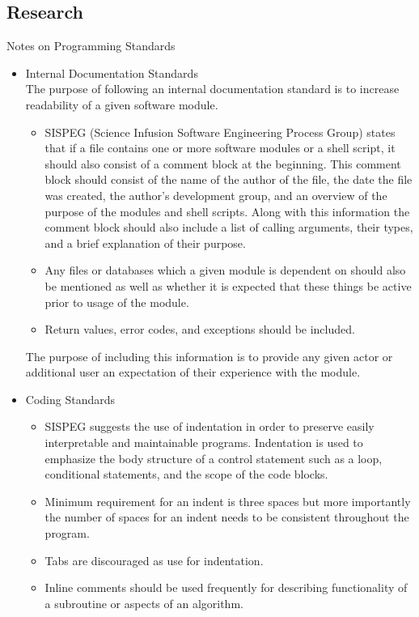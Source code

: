 \documentclass[12pt]{article}
\begin{document}
\subsection*{Research}
Notes on Programming Standards
\begin{itemize}
\item Internal Documentation Standards\\
	The purpose of following an internal documentation standard is to increase readability of a given software module. 
	\begin{itemize}
	\item SISPEG (Science Infusion Software Engineering Process Group) states that if a file contains one or more software modules or a shell script, it should also consist of a comment block at the beginning. This comment block should consist of the name of the author of the file, the date the file was created, the author's development group, and an overview of the purpose of the modules and shell scripts. Along with this information the comment block should also include a list of calling arguments, their types, and a brief explanation of their purpose. 
	\item Any files or databases which a given module is dependent on should also be mentioned as well as whether it is expected that these things be active prior to usage of the module. 		\item Return values, error codes, and exceptions should be included. 
	\end{itemize}
	The purpose of including this information is to provide any given actor or additional user an expectation of their experience with the module.
	
\item Coding Standards\\
	\begin{itemize}
	\item SISPEG suggests the use of indentation in order to preserve easily interpretable and maintainable programs. Indentation is used to emphasize the body structure of a control statement such as a loop, conditional statements, and the scope of the code blocks. 
	\item Minimum requirement for an indent is three spaces but more importantly the number of spaces for an indent needs to be consistent throughout the program. 
	\item Tabs are discouraged as use for indentation. 
	\item Inline comments should be used frequently for describing functionality of a subroutine or aspects of an algorithm.
	\end{itemize}
		

\end{itemize}
\end{document}
